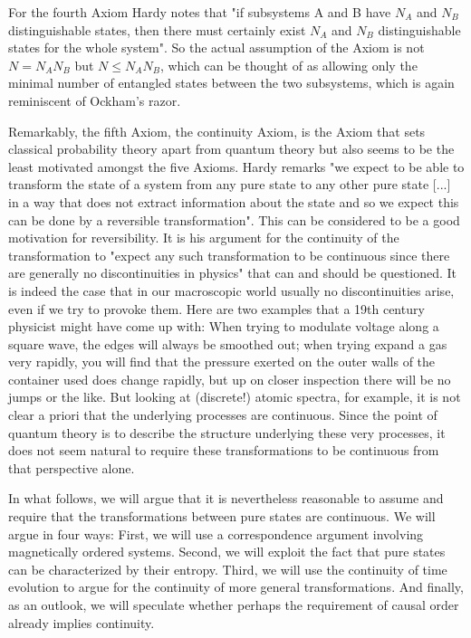 \documentclass[11pt, a4paper]{article}
\begin{document}
For the fourth Axiom Hardy notes that "if subsystems A and B have $N_A$ and $N_B$ distinguishable states, then there must certainly exist $N_A$ and $N_B$ distinguishable states for the whole system". So the actual assumption of the Axiom is not $N=N_AN_B$ but $N\leq N_AN_B$, which can be thought of as allowing only the minimal number of entangled states between the two subsystems, which is again reminiscent of Ockham's razor. \par
Remarkably, the fifth Axiom, the continuity Axiom, is the Axiom that sets classical probability theory apart from quantum theory but also seems to be the least motivated amongst the five Axioms. Hardy remarks "we expect to be able to transform the state of a system from any pure state to any other pure state [...] in a way that does not extract information about the state and so we expect this can be done by a reversible transformation". This can be considered to be a good motivation for reversibility. It is his argument for the continuity of the transformation to "expect any such transformation to be continuous since there are generally no discontinuities in physics" that can and should be questioned. It is indeed the case that in our macroscopic world usually no discontinuities arise, even if we try to provoke them. Here are two examples that a 19th century physicist might have come up with: When trying to modulate voltage along a square wave, the edges will always be smoothed out; when trying  expand a gas very rapidly, you will find that the pressure exerted on the outer walls of the container used does change rapidly, but up on closer inspection there will be no jumps or the like. But looking at (discrete!) atomic spectra, for example, it is not clear a priori that the underlying processes are continuous. Since the point of quantum theory is to describe the structure underlying these very processes, it does not seem natural to require these transformations to be continuous from that perspective alone.\par
In what follows, we will argue that it is nevertheless reasonable to assume and require that the transformations between pure states are continuous. We will argue in four ways: First, we will use a correspondence argument involving magnetically ordered systems. Second, we will exploit the fact that pure states can be characterized by their entropy. Third, we will use the continuity of time evolution to argue for the continuity of more general transformations. And finally, as an outlook, we will speculate whether perhaps the requirement of causal order already implies continuity.\par
\end{document}
